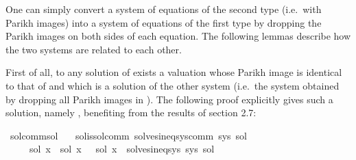 \begin{isabellebody}
\isamarkupfalse%
%
\endisatagproof
{\isafoldproof}%
%
\isadelimproof
\isanewline
%
\endisadelimproof
\isanewline
{}\isamarkupfalse%
%
\isadelimdocument
%
\endisadelimdocument
%
\isatagdocument
%
\isamarkuptrue%
%
\endisatagdocument
{\isafolddocument}%
%
\isadelimdocument
%
\endisadelimdocument
%
\begin{isamarkuptext}%
One can simply convert a system  of equations of the second type (i.e.\ with Parikh
images) into a system of equations of the first type by dropping the Parikh images on both sides of
each equation. The following lemmas describe how the two systems are related to each other.

First of all, to any solution  of  exists a valuation whose Parikh image is
identical to that of  and which is a solution of the other system (i.e.\ the system obtained
by dropping all Parikh images in ). The following proof explicitly gives such a solution,
namely , benefiting from the results of section 2.7:%
\end{isamarkuptext}\isamarkuptrue%
\isamarkupfalse%
\ sol{\isacharunderscore}{\kern0pt}comm{\isacharunderscore}{\kern0pt}sol{\isacharcolon}{\kern0pt}\isanewline
\ \ \ sol{\isacharunderscore}{\kern0pt}is{\isacharunderscore}{\kern0pt}sol{\isacharunderscore}{\kern0pt}comm{\isacharcolon}{\kern0pt}\ {\isachardoublequoteopen}solves{\isacharunderscore}{\kern0pt}ineq{\isacharunderscore}{\kern0pt}sys{\isacharunderscore}{\kern0pt}comm\ sys\ sol{\isachardoublequoteclose}\isanewline
\ \ \ \ \ {\isachardoublequoteopen}{\isasymexists}sol{\isacharprime}{\kern0pt}{\isachardot}{\kern0pt}\ {\isacharparenleft}{\kern0pt}{\isasymforall}x{\isachardot}{\kern0pt}\ {\isasymPsi}\ {\isacharparenleft}{\kern0pt}sol\ x{\isacharparenright}{\kern0pt}\ {\isacharequal}{\kern0pt}\ {\isasymPsi}\ {\isacharparenleft}{\kern0pt}sol{\isacharprime}{\kern0pt}\ x{\isacharparenright}{\kern0pt}{\isacharparenright}{\kern0pt}\ {\isasymand}\ solves{\isacharunderscore}{\kern0pt}ineq{\isacharunderscore}{\kern0pt}sys\ sys\ sol{\isacharprime}{\kern0pt}{\isachardoublequoteclose}\isanewline

\end{isabellebody}
